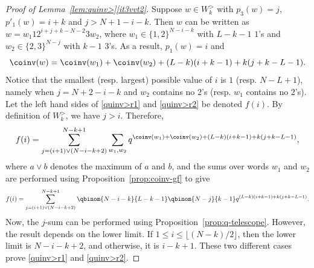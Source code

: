 \begin{proof}[Proof of Lemma~\ref{lem:quinv>}\ref{it3vvt2}]
Suppose $w \in  W_k^>$ with $p_3(w) = j$, $p'_1(w) = i+k$ and $j > N+1 - i-k$. Then
$w$ can be written as $w = w_1 1 2^{i+j+k-N-2} 3 w_2$, where $w_1 \in \{1,2\}^{N-i-k}$ with $L-k-1$ $1$'s
and $w_2 \in \{2,3\}^{N-j}$ with $k-1$ $3$'s. As a result, $p_1(w) = i$ and
\[
\coinv(w) = \coinv(w_1) + \coinv(w_2) + (L-k)(i+k-1) + k(j+k-L-1).
\]
Notice that the smallest (resp. largest) possible value of $i$ is $1$ (resp. $N-L+1$), namely when 
$j = N+2-i-k$ and $w_2$ contains no $2$'s
(resp. $w_1$ contains no $2$'s).
Let the left hand sides of \eqref{quinv>r1} and \eqref{quinv>r2} be denoted $f(i)$.
By definition of $W_k^>$, we have $j > i$. Therefore,
\[
f(i) = \sum_{j=(i+1) \vee (N-i-k+2)}^{N-k+1} \sum_{w_1,w_2} q^{\coinv(w_1) + \coinv(w_2) + (L-k)(i+k-1) + k(j+k-L-1)},
\]
where $a \vee b$ denotes the maximum of $a$ and $b$,
and the sums over words $w_1$ and $w_2$ are performed using Proposition~\ref{prop:coinv-gf} to give
\[
f(i) = \sum_{j=(i+1) \vee (N-i-k+2)}^{N-k+1} \qbinom {N-i-k}{L-k-1} \qbinom{N-j}{k-1} q^{ (L-k)(i+k-1) + k(j+k-L-1)}.
\]
Now, the $j$-sum can be performed using Proposition~\ref{prop:q-telescope}. However, the result depends on 
the lower limit. If $1 \leq i \leq \lfloor (N-k)/2 \rfloor$, then the lower limit is $N-i-k+2$, and otherwise,
it is $i-k+1$. These two different cases prove \eqref{quinv>r1} and \eqref{quinv>r2}.
\end{proof}

